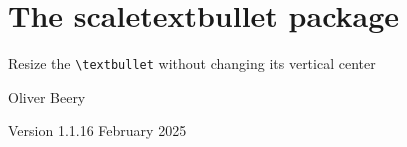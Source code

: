 \documentclass{article}
\begin{document}
\section*{\Large The \textsf{scaletextbullet} package}

Resize the \texttt{\textbackslash{}textbullet} without changing its vertical center

Oliver Beery

Version 1.1.1\quad{}6 February 2025

%
\end{document}
